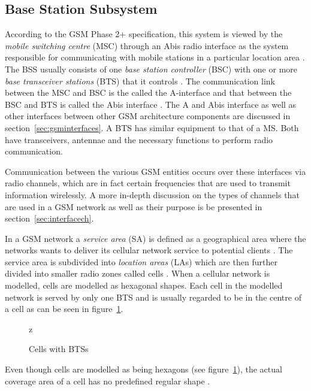 \subsection{Base Station Subsystem}

According to the GSM Phase 2+ specification, this system is viewed by the \emph{mobile switching centre} (MSC) through an Abis radio interface as the system responsible for communicating with mobile stations in a particular location area \cite{Eisenblatter}. The BSS usually consists of one \emph{base station controller} (BSC) with one or more \emph{base transceiver stations} (BTS) that it controls \cite{Eisenblatter}. The communication link between the MSC and BSC is the called the A-interface and that between the BSC and BTS is called the Abis interface \cite{Eisenblatter}. The A and Abis interface as well as other interfaces between other GSM architecture components are discussed in section~\ref{sec:gsminterfaces}. A BTS has similar equipment to that of a MS\cite{GSMSysEngin}. Both have transceivers, antennae and the necessary functions to perform radio communication. 

Communication between the various GSM entities occurs over these interfaces via radio channels, which are in fact certain frequencies that are used to transmit information wirelessly. A more in-depth discussion on the types of channels that are used in a GSM network as well as their purpose is be presented in section~\ref{sec:interfacech}.

In a GSM network a \emph{service area} (SA) is defined as a geographical area where the networks wants to deliver its cellular network service to potential clients \cite{GSMArchitectureProtocolsServices, Karen2004}. The service area is subdivided into \emph{location areas} (LAs) which are then further divided into smaller radio zones called cells \cite{GSMSecurInTeleNetwork}. When a cellular network is modelled, cells are modelled as hexagonal shapes. Each cell in the modelled network is served by only one BTS and is usually regarded to be in the centre of a cell as can be seen in figure~\ref{fig:GSMCell}\cite{GSMArchitectureProtocolsServices}. 
\begin{figure}[H]
	\begin{centering}
		
		\caption{Cells with BTSs}
		\label{fig:GSMCell}
	\end{centering}z
\end{figure}
Even though cells are modelled as being hexagons (see figure~\ref{fig:GSMCell}), the actual coverage area of a cell has no predefined regular shape \cite{GSMArchitectureProtocolsServices}.

